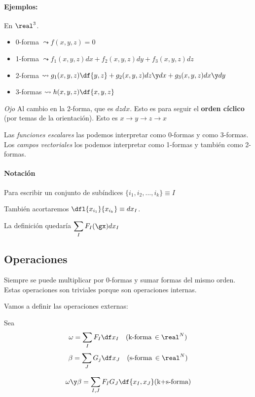 \paragraph{Ejemplos:} En $\real^3$.

\begin{itemize}
\item 0-forma $\leadsto f(x,y,z) = 0$
\item 1-forma $\leadsto f_1(x,y,z)dx + f_2(x,y,z)dy + f_3(x,y,z)dz$
\item 2-forma $\leadsto g_1(x,y,z)\df{y,z} + g_2(x,y,z)dz\y dx + g_3(x,y,z)dx\y dy$
\item 3-formas $\leadsto h(x,y,z)\df{x,y,z}$
\end{itemize}

\emph{Ojo} Al cambio en la 2-forma, que es $dzdx$. Esto es para seguir el \textbf{orden cíclico} (por temas de la orientación). Esto es $x\to y \to z \to x$


\obs Las \textit{funciones escalares} las podemos interpretar como 0-formas y como 3-formas. Los \textit{campos vectoriales} los podemos interpretar como 1-formas y también como 2-formas.

\paragraph{Notación}
Para escribir un conjunto de subíndices $\{i_1,i_2,...,i_k\} \equiv I$

También acortaremos $\dfl{x_{i_1}}{x_{i_k}} \equiv dx_I$. 

La definición quedaría $\displaystyle \sum_I F_I(\gx)dx_I$

\subsection{Operaciones}
Siempre se puede multiplicar por 0-formas y sumar formas del mismo orden. Estas operaciones son triviales porque son operaciones internas.

Vamos a definir las operaciones externas:

\begin{defn}
Sea \[\omega = \sum_I F_I \df x_I\quad (\text{k-forma}\,\in\real^N)\]
\[\beta = \sum_J G_j \df x_J\quad (\text{s-forma}\,\in\real^N)\]

\[\omega\y\beta = \sum_{I,J} F_IG_J \df{x_I,x_J} (\text{k+s-forma})\]
\end{defn}

